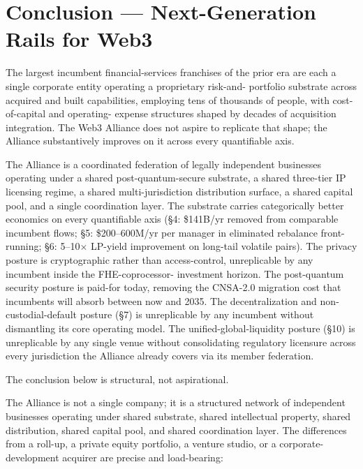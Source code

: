\section{Conclusion --- Next-Generation Rails for Web3}

The largest incumbent financial-services franchises of the prior era
are each a single corporate entity operating a proprietary risk-and-
portfolio substrate across acquired and built capabilities, employing
tens of thousands of people, with cost-of-capital and operating-
expense structures shaped by decades of acquisition integration. The
Web3 Alliance does not aspire to replicate that shape; the Alliance
substantively improves on it across every quantifiable axis.

The Alliance is a coordinated federation of legally independent
businesses operating under a shared post-quantum-secure substrate, a
shared three-tier IP licensing regime, a shared multi-jurisdiction
distribution surface, a shared capital pool, and a single coordination
layer. The substrate carries categorically better economics on every
quantifiable axis (\S 4: \$141B/yr removed from comparable incumbent
flows; \S 5: \$200--600M/yr per manager in eliminated rebalance
front-running; \S 6: 5--10$\times$ LP-yield improvement on long-tail
volatile pairs). The privacy posture is cryptographic rather than
access-control, unreplicable by any incumbent inside the FHE-coprocessor-
investment horizon. The post-quantum security posture is paid-for today,
removing the CNSA-2.0 migration cost that incumbents will absorb between
now and 2035. The decentralization and non-custodial-default posture
(\S 7) is unreplicable by any incumbent without dismantling its core
operating model. The unified-global-liquidity posture (\S 10) is
unreplicable by any single venue without consolidating regulatory
licensure across every jurisdiction the Alliance already covers via
its member federation.

The conclusion below is structural, not aspirational.

The Alliance is not a single company; it is a structured network of
independent businesses operating under shared substrate, shared
intellectual property, shared distribution, shared capital pool, and
shared coordination layer. The differences from a roll-up, a private
equity portfolio, a venture studio, or a corporate-development
acquirer are precise and load-bearing:


